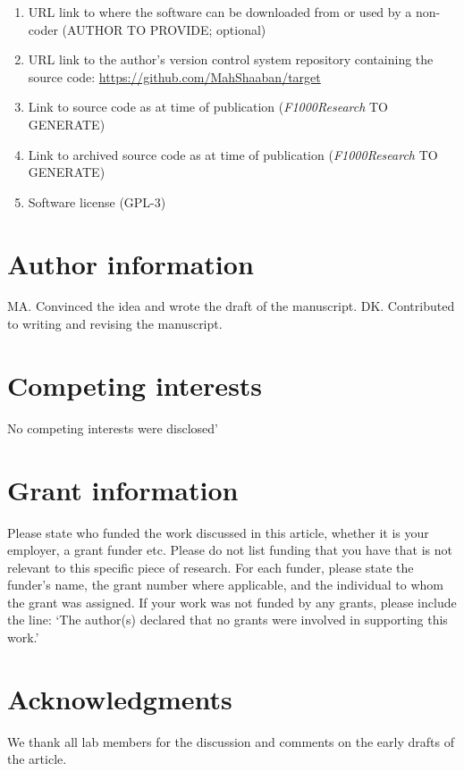 \documentclass[9pt,a4paper,]{extarticle}
\begin{document}
\begin{enumerate}
\def\labelenumi{\arabic{enumi}.}
\item
  URL link to where the software can be downloaded from or used by a non-coder (AUTHOR TO PROVIDE; optional)
\item
  URL link to the author's version control system repository containing the source code: \url{https://github.com/MahShaaban/target}
\item
  Link to source code as at time of publication (\emph{F1000Research} TO GENERATE)
\item
  Link to archived source code as at time of publication (\emph{F1000Research} TO GENERATE)
\item
  Software license (GPL-3)
\end{enumerate}

\hypertarget{author-information}{%
\section{Author information}\label{author-information}}

MA. Convinced the idea and wrote the draft of the manuscript.
DK. Contributed to writing and revising the manuscript.

\hypertarget{competing-interests}{%
\section{Competing interests}\label{competing-interests}}

No competing interests were disclosed'

\hypertarget{grant-information}{%
\section{Grant information}\label{grant-information}}

Please state who funded the work discussed in this article, whether it is your employer, a grant funder etc. Please do not list funding that you have that is not relevant to this specific piece of research. For each funder, please state the funder's name, the grant number where applicable, and the individual to whom the grant was assigned. If your work was not funded by any grants, please include the line: `The author(s) declared that no grants were involved in supporting this work.'

\hypertarget{acknowledgments}{%
\section{Acknowledgments}\label{acknowledgments}}

We thank all lab members for the discussion and comments on the early drafts of the article.

{\small}
\end{document}
